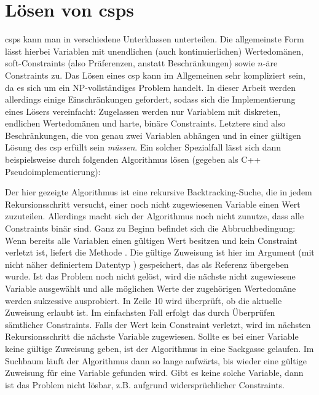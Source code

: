 \section{Lösen von \acp{csp}}
\label{sec:Solving}
\acp{csp} kann man in verschiedene Unterklassen unterteilen. Die allgemeinste Form lässt hierbei Variablen mit unendlichen (auch kontinuierlichen) Wertedomänen, soft-Constraints
(also Präferenzen, anstatt Beschränkungen) sowie $n$-äre Constraints zu. Das Lösen eines \ac*{csp} kann im Allgemeinen sehr kompliziert sein, da es sich um ein NP-vollständiges
Problem handelt. In dieser Arbeit werden allerdings einige Einschränkungen gefordert, sodass sich die Implementierung eines Lösers vereinfacht: Zugelassen werden nur Variablem mit
diskreten, endlichen Wertedomänen und harte, binäre Constraints. Letztere sind also Beschränkungen, die von genau zwei Variablen abhängen und in einer gültigen Lösung des \ac*{csp}
erfüllt sein \textit{müssen}. Ein solcher Spezialfall lässt sich dann beispielsweise durch folgenden Algorithmus lösen (gegeben als C++ Pseudoimplementierung):

Der hier gezeigte Algorithmus ist eine rekursive Backtracking-Suche, die in jedem Rekursionsschritt versucht, einer noch nicht zugewiesenen Variable einen Wert zuzuteilen. Allerdings
macht sich der Algorithmus noch nicht zunutze, dass alle Constraints binär sind. Ganz zu Beginn befindet sich die Abbruchbedingung: Wenn bereits alle Variablen einen gültigen Wert
besitzen und kein Constraint verletzt ist, liefert die Methode  . Die gültige Zuweisung ist hier im Argument  (mit nicht näher
definiertem Datentyp ) gespeichert, das als Referenz übergeben wurde. Ist das Problem noch nicht gelöst, wird die nächste nicht zugewiesene Variable ausgewählt und
alle möglichen Werte der zugehörigen Wertedomäne werden sukzessive ausprobiert. In Zeile 10 wird überprüft, ob die aktuelle Zuweisung erlaubt ist. Im einfachsten Fall erfolgt das
durch Überprüfen sämtlicher Constraints. Falls der Wert kein Constraint verletzt, wird im nächsten Rekursionsschritt die nächste Variable zugewiesen. Sollte es bei einer Variable
keine gültige Zuweisung geben, ist der Algorithmus in eine Sackgasse gelaufen. Im Suchbaum läuft der Algorithmus dann so lange aufwärts, bis wieder eine gültige Zuweisung für eine
Variable gefunden wird. Gibt es keine solche Variable, dann ist das Problem nicht lösbar, z.B. aufgrund  widersprüchlicher Constraints. 

